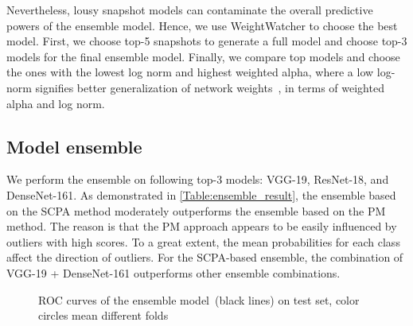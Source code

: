 \documentclass[conference]{IEEEtran}
\begin{document}
Nevertheless, lousy snapshot models can contaminate the overall predictive powers of the ensemble model. Hence, we use WeightWatcher to choose the best model. First, we choose top-5 snapshots to generate a full model and choose top-3 models for the final ensemble model. Finally, we compare top models
and choose the ones with the lowest log norm and highest weighted alpha, where a low log-norm signifies better generalization of network weights~\cite{martin2019traditional}, %
in terms of weighted alpha and log norm.

\subsection{Model ensemble}
\label{model_ensemble}
We perform the ensemble on following top-3 models: VGG-19, ResNet-18, and DenseNet-161. %
As demonstrated in \cref{Table:ensemble_result}, the ensemble based on the SCPA method moderately outperforms the ensemble based on the PM method. The reason is that the PM approach appears to be easily influenced by outliers with high scores. To a great extent, the mean probabilities for each class affect the direction of outliers. For the SCPA-based ensemble, the combination of VGG-19 + DenseNet-161 outperforms other ensemble combinations.  

\iffalse
\begin{figure}
   \centering
    \caption{ROC curves of the ensemble model~(black lines) on test set, color circles mean different folds} 
     \label{fig:rocs}
     \vspace{-2mm}
\end{figure}
\end{document}
